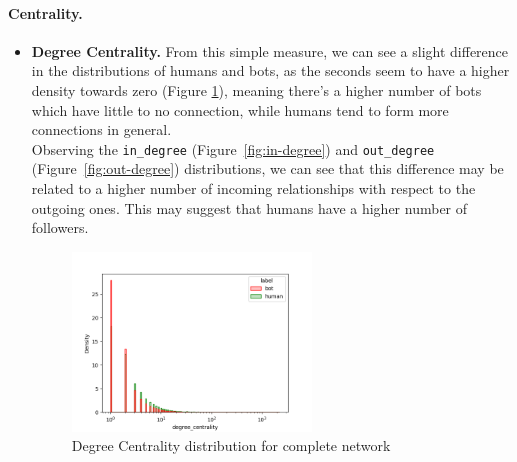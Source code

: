 \documentclass[12pt, a4paper]{article}
\begin{document}
    	\paragraph{Centrality.}
		\begin{itemize}
			\item \textbf{Degree Centrality.} From this simple measure, we can see a slight difference in the distributions of humans and bots, as the seconds seem to have a higher density towards zero (Figure \ref{fig:degree_centrality}), meaning there's a higher number of bots which have little to no connection, while humans tend to form more connections in general.\\
				Observing the \texttt{in\_degree} (Figure~\ref{fig:in-degree}) and \texttt{out\_degree} (Figure~\ref{fig:out-degree}) distributions, we can see that this difference may be related to a higher number of incoming relationships with respect to the outgoing ones. This may suggest that humans have a higher number of followers.
                \begin{figure}[H]
                	\centering
                    \includegraphics[width=0.6\textwidth]{results/complete_degree_centrality.png}
                    \caption{Degree Centrality distribution for complete network}
                    \label{fig:degree_centrality}
                \end{figure}
				\begin{figure}[H]
    				\centering
    				\setlength{\fboxsep}{0pt}
    				\setlength{\fboxrule}{0.5pt}

\end{figure}
\end{itemize}
\end{document}
